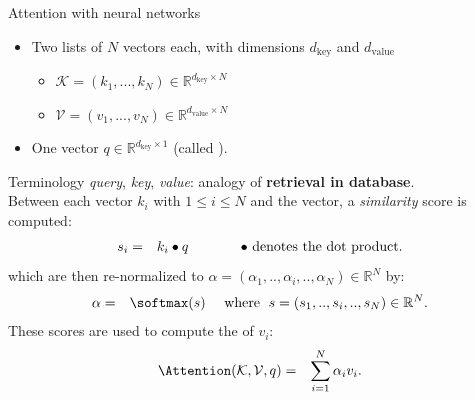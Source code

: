 \begin{frame}{Attention with neural networks}
\begin{itemize}
\item Two lists of $N$ vectors each, with dimensions $d_{\text{key}}$ and $d_{\text{value}}$\\
\begin{itemize}
\item {} $\mathcal{K} = (k_1, ..., k_N) \in \mathbb{R}^{d_{\text{key}} \times N}$ \\
\item {} $\mathcal{V}=(v_1, ..., v_N) \in \mathbb{R}^{d_{\text{value}} \times N}$\\
\end{itemize}
\item One vector $q \in \mathbb{R}^{d_{\text{key}} \times 1}$ (called ).\\
\end{itemize}
\vsp
Terminology \textit{query}, \textit{key}, \textit{value}: analogy of \textbf{retrieval in database}.\\
\pause
\vspace{1mm}
Between each  vector $k_{i}$ with $1 \leq i \leq N$ and the  vector, a \textit{similarity} score is computed:
      \begin{eqnarray*}
              s_{i}&=& k_{i}\bullet q \text{\hspace{12mm} $\bullet$ denotes the dot product.}
      \end{eqnarray*}
\pause
which are then re-normalized to $\alpha = (\alpha_{1}, .., \alpha_{i}, .., \alpha_{N}) \in \mathbb{R}^{N}$ by:
      \begin{eqnarray*}
              \alpha &=& \softmax(s) \text{\hspace{3.5mm} where \hspace{1mm}} s = (s_{1}, .., s_{i}, .., s_{N}) \in \mathbb{R}^{N}.
      \end{eqnarray*}
\pause
These scores are used to compute the  of $v_{i}$:
      \begin{eqnarray*}
              \Attention(\mathcal{K}, \mathcal{V}, q) &=& \sum_{i=1}^{N} \alpha_{i} v_{i}.
      \end{eqnarray*}
\end{frame}

